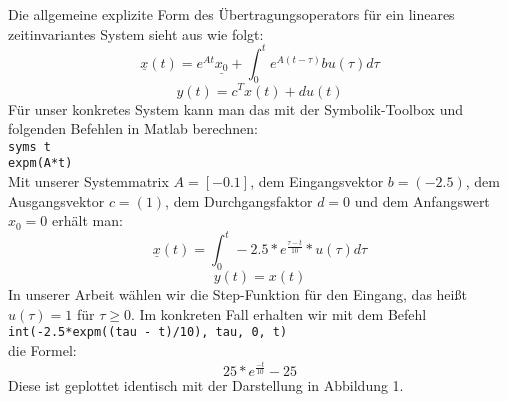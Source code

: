 Die allgemeine explizite Form des Übertragungsoperators für ein lineares zeitinvariantes System sieht aus wie folgt:
\begin{equation*}
    \underline{x}(t) = e^{At}\underline{x_0}+\int_{0}^{t}e^{A(t- \tau )}bu(\tau )d\tau
\end{equation*}
\begin{equation*}
    y(t) = c^{T}x(t)+du(t)
\end{equation*}
Für unser konkretes System kann man das mit der Symbolik-Toolbox und folgenden Befehlen in Matlab berechnen:\\
\hspace*{0.5cm}\texttt{syms t}\\
\hspace*{0.5cm}\texttt{expm(A*t)}\\
Mit unserer Systemmatrix $A = [-0.1]$, dem Eingangsvektor $b = (-2.5)$, dem Ausgangsvektor $c = (1)$, dem Durchgangsfaktor $d = 0$ und dem Anfangswert $x_0 = 0$ erhält man:
\begin{equation*}
    \underline{x}(t) = \int_{0}^{t}-2.5*e^{\frac{\tau - t}{10}}*u(\tau )d\tau
\end{equation*}
\begin{equation*}
    y(t) = x(t)
\end{equation*}
In unserer Arbeit wählen wir die Step-Funktion für den Eingang, das heißt $u(\tau ) = 1$ für $\tau \geq 0$. Im konkreten Fall erhalten wir mit dem Befehl\\ \texttt{int(-2.5*expm((tau - t)/10), tau, 0, t)}\\ die Formel:
\begin{equation*}
    25*e^{\frac{-t}{10}} -25
\end{equation*}
Diese ist geplottet identisch mit der Darstellung in Abbildung 1.